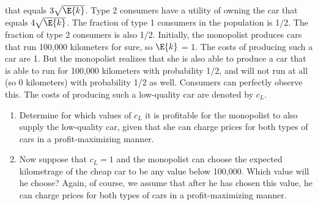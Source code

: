 \begin{enumerate}
	      that equals $3\sqrt{\E{k}}$. Type 2 consumers have a utility of owning the car that equals
	      $4\sqrt{\E{k}}$. The fraction of type 1 consumers in the population is 1/2. The fraction
	      of type 2 consumers is also 1/2. Initially, the monopolist produces cars that run
	      100,000 kilometers for sure, so $\E{k}$ = 1. The costs of producing such a car are 1.
	      But the monopolist realizes that she is also able to produce a car that is able to run
	      for 100,000 kilometers with probability 1/2, and will not run at all (so 0 kilometers)
	      with probability 1/2 as well. Consumers can perfectly observe this. The costs of
	      producing such a low-quality car are denoted by $c_L$.
	      \begin{enumerate}
		      \item Determine for which values of $c_L$ it is profitable for the monopolist to also
		            supply the low-quality car, given that she can charge prices for both types of
		            cars in a profit-maximizing manner.
		      \item Now suppose that $c_L = 1$ and the monopolist can choose the expected kilometrage of the cheap car to be any value below 100,000.
		            Which value will he
		            choose? Again, of course, we assume that after he has chosen this value, he
		            can charge prices for both types of cars in a profit-maximizing manner.
	      \end{enumerate}


\end{enumerate}

